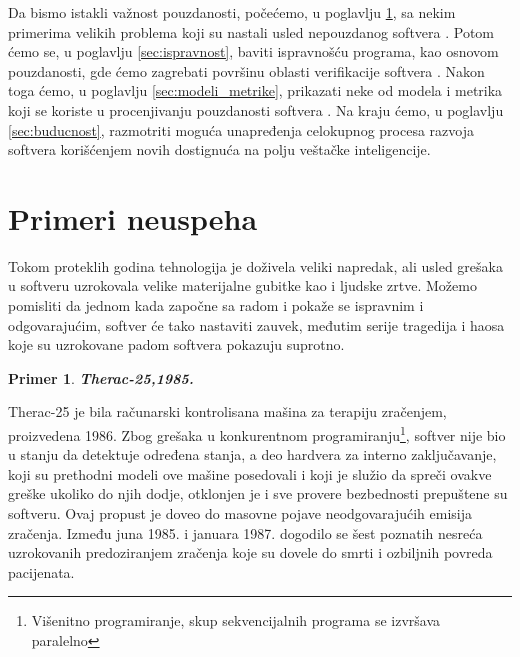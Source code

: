 \documentclass[a4paper]{article}
\newtheorem{primer}{Primer}[section]
\begin{document}
Da bismo istakli važnost pouzdanosti, počećemo, u poglavlju \ref{sec:primeri}, sa nekim primerima velikih problema koji su nastali usled nepouzdanog softvera \cite{quinn_ethics}.
Potom ćemo se, u poglavlju \ref{sec:ispravnost}, baviti ispravnošću programa, kao osnovom pouzdanosti, gde ćemo zagrebati površinu oblasti verifikacije softvera \cite{laski2009software}.
Nakon toga ćemo, u poglavlju \ref{sec:modeli_metrike}, prikazati neke od modela i metrika koji se koriste u procenjivanju pouzdanosti softvera \cite{pham_reliability}.
Na kraju ćemo, u poglavlju \ref{sec:buducnost}, razmotriti moguća unapređenja celokupnog procesa razvoja softvera korišćenjem novih dostignuća na polju veštačke inteligencije.


\section{Primeri neuspeha}
\label{sec:primeri}

Tokom proteklih godina tehnologija je doživela veliki napredak, ali usled grešaka u softveru uzrokovala velike materijalne gubitke kao i ljudske zrtve.
Možemo pomisliti da jednom kada započne sa radom i pokaže se ispravnim i odgovarajućim, softver će tako nastaviti zauvek, međutim serije tragedija i haosa koje su uzrokovane padom softvera pokazuju suprotno.\\

\begin{primer}
\textbf{Therac-25,1985.}
\end{primer}
Therac-25 je bila računarski kontrolisana mašina za terapiju zračenjem, proizvedena 1986.
Zbog grešaka u konkurentnom programiranju\footnote{ Višenitno programiranje, skup sekvencijalnih programa se izvršava paralelno}, softver nije bio u stanju da detektuje određena stanja, a deo hardvera za interno zaključavanje, koji su prethodni modeli ove mašine posedovali i koji je služio da spreči ovakve greške ukoliko do njih dodje, otklonjen je i sve provere bezbednosti prepuštene su softveru. Ovaj propust je doveo do masovne pojave neodgovarajućih emisija zračenja.
Između juna 1985. i januara 1987. dogodilo se šest poznatih nesreća uzrokovanih predoziranjem zračenja koje su dovele do smrti i ozbiljnih povreda pacijenata.\\
\end{document}
